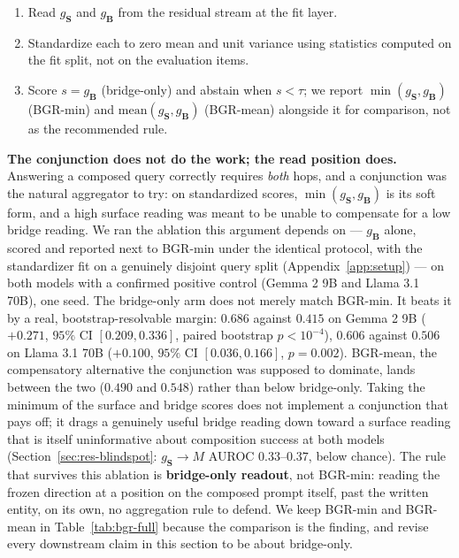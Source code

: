 \documentclass{article}
\newif\ifredflags
\newcommand{\rf}[1]{\ifredflags{\textcolor{red}{\textbf{[MISSING: #1]}}}\fi}
\newcommand{\gate}{\mathbf{S}}
\newcommand{\bridge}{\mathbf{B}}
\begin{document}
\begin{enumerate}
\itemsep0em
\item Read $g_{\gate}$ and $g_{\bridge}$ from the residual stream at the fit layer.
\item Standardize each to zero mean and unit variance using statistics computed on the fit split, not
on the evaluation items.
\item Score $s=g_{\bridge}$ (bridge-only) and abstain when $s<\tau$; we report $\min(g_{\gate},g_{\bridge})$
(BGR-min) and $\mathrm{mean}(g_{\gate},g_{\bridge})$ (BGR-mean) alongside it for comparison, not as the
recommended rule.
\end{enumerate}

\textbf{The conjunction does not do the work; the read position does.} Answering a composed query
correctly requires \emph{both} hops, and a conjunction was the natural aggregator to try: on
standardized scores, $\min(g_{\gate},g_{\bridge})$ is its soft form, and a high surface reading was
meant to be unable to compensate for a low bridge reading. We ran the ablation this argument depends on
--- $g_{\bridge}$ alone, scored and reported next to BGR-min under the identical protocol, with the
standardizer fit on a genuinely disjoint query split (Appendix~\ref{app:setup}) --- on both models with a
confirmed positive control (Gemma 2 9B and Llama 3.1 70B), one seed. The bridge-only arm does not merely
match BGR-min. It beats it by a real, bootstrap-resolvable margin: $0.686$ against $0.415$ on Gemma 2 9B
($+0.271$, $95\%$ CI $[0.209,0.336]$, paired bootstrap $p<10^{-4}$), $0.606$ against $0.506$ on
Llama 3.1 70B ($+0.100$, $95\%$ CI $[0.036,0.166]$, $p=0.002$). BGR-mean, the compensatory alternative
the conjunction was supposed to dominate, lands between the two ($0.490$ and $0.548$) rather than below
bridge-only. Taking the minimum of the surface and bridge scores does not implement a conjunction that
pays off; it drags a genuinely useful bridge reading down toward a surface reading that is itself
uninformative about composition success at both models (Section~\ref{sec:res-blindspot}:
$g_{\gate}\!\to\!M$ AUROC $0.33$--$0.37$, below chance). The rule that survives this ablation is
\textbf{bridge-only readout}, not BGR-min: reading the frozen direction at a position on the composed
prompt itself, past the written entity, on its own, no aggregation rule to defend. We keep BGR-min and
BGR-mean in Table~\ref{tab:bgr-full} because the comparison is the finding, and revise every downstream
claim in this section to be about bridge-only.
\rf{the same ablation under 5 seeds, matching the positive control's own seed count. Also worth
checking directly: whether the offset $-1$ found here (one token BEFORE the entity's own last token,
not the $+1$ an earlier, contaminated version of this analysis reported) replicates as the peak once
seeds vary, since a single-seed peak offset is itself a selection that has not been stress-tested.}
\end{document}

